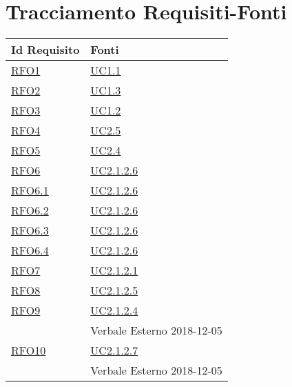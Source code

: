 \section{Tracciamento Requisiti-Fonti}
\normalsize
\begin{longtable}{|>{\centering}m{5cm}|m{5cm}<{\centering}|}
	\hline
	\textbf{Id Requisito} & \textbf{Fonti}\\
	\hline
	\endhead
	\hyperlink{RFO1}{RFO1} & \hyperref[UC1.1]{UC1.1}\\ \hline
	
	\hyperlink{RFO2}{RFO2} & \hyperref[UC1.3]{UC1.3}\\ \hline
	
	\hyperlink{RFO3}{RFO3} & \hyperref[UC1.2]{UC1.2}\\ \hline
	
	\hyperlink{RFO4}{RFO4} & \hyperref[UC2.5]{UC2.5}\\ \hline
	
	\hyperlink{RFO5}{RFO5} & \hyperref[UC2.4]{UC2.4}\\ \hline
	
	\hyperlink{RFO6}{RFO6} & \hyperref[UC2.1.2.6]{UC2.1.2.6}\\ \hline
	
	\hyperlink{RFO6.1}{RFO6.1} & \hyperref[UC2.1.2.6]{UC2.1.2.6}\\ \hline
	
	\hyperlink{RFO6.2}{RFO6.2} & \hyperref[UC2.1.2.6]{UC2.1.2.6}\\ \hline
	
	\hyperlink{RFO6.3}{RFO6.3} & \hyperref[UC2.1.2.6]{UC2.1.2.6}\\ \hline
	
	\hyperlink{RFO6.4}{RFO6.4} & \hyperref[UC2.1.2.6]{UC2.1.2.6}\\ \hline
	
	\hyperlink{RFO7}{RFO7} & \hyperref[UC2.1.2.1]{UC2.1.2.1}\\ \hline
	
	\hyperlink{RFO8}{RFO8} & \hyperref[UC2.1.2.5]{UC2.1.2.5}\\ \hline
	
	\hyperlink{RFO9}{RFO9} & \hyperref[UC2.1.2.4]{UC2.1.2.4} \\& Verbale Esterno 2018-12-05\\ \hline
	
	\hyperlink{RFO10}{RFO10} & \hyperref[UC2.1.2.7]{UC2.1.2.7} \\& Verbale Esterno 2018-12-05\\ \hline
	

\end{longtable}
